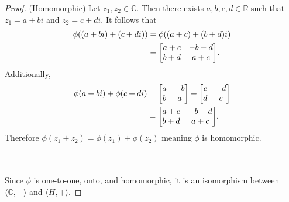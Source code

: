 \documentclass[12pt]{extarticle}
\begin{document}
\begin{proof}
	\qquad\begin{minipage}{\dimexpr\textwidth-2cm}
		(Homomorphic)\quad 
		Let $z_1, z_2 \in \mathbb{C}$. Then there exists $a,b,c,d \in \mathbb{R}$ such that $z_1 = a+bi$ and $z_2 = c+di$. It follows that
		\begin{align*}
			\phi((a+bi) + (c+di)) &= \phi((a+c) + (b+d)i) \\
														&= \mqty[a + c & -b-d \\ b + d & a + c]
		.\end{align*}
		Additionally,
		\begin{align*}
			\phi(a+bi) + \phi(c+di) &= \mqty[a & -b \\ b & a] + \mqty[c & -d \\ d & c] \\
														&= \mqty[a + c & -b-d \\ b + d & a + c]
		.\end{align*}
		Therefore $\phi(z_1 + z_2) = \phi(z_1) + \phi(z_2)$ meaning $\phi$ is homomorphic.
	\end{minipage} \\
	\\

	Since $\phi$ is one-to-one, onto, and homomorphic, it is an isomorphism between $\langle \mathbb{C}, + \rangle$ and $\langle H, + \rangle$.
\end{proof}
\end{document}
